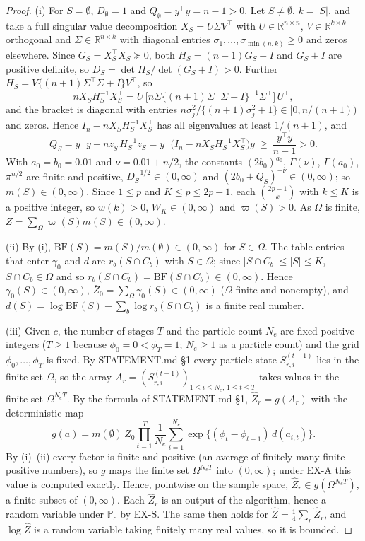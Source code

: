 \documentclass[11pt]{article}
\theoremstyle{remark}
\newcommand{\Zh}{\widehat Z}
\newcommand{\Pc}{\mathbb{P}_c}
\begin{document}
\begin{proof}
(i) For $S=\emptyset$, $D_\emptyset=1$ and $Q_\emptyset=y^\top y=n-1>0$. Let $S\neq\emptyset$, $k=|S|$, and take a full
singular value decomposition $X_S=U\Sigma V^\top$ with $U\in\mathbb{R}^{n\times n}$, $V\in\mathbb{R}^{k\times k}$ orthogonal
and $\Sigma\in\mathbb{R}^{n\times k}$ with diagonal entries $\sigma_1,\dots,\sigma_{\min(n,k)}\ge0$ and zeros elsewhere.
Since $G_S=X_S^\top X_S\succeq0$, both $H_S=(n+1)G_S+I$ and $G_S+I$ are positive definite, so $D_S=\det H_S/\det(G_S+I)>0$.
Further $H_S=V\{(n+1)\Sigma^\top\Sigma+I\}V^\top$, so
\[
nX_SH_S^{-1}X_S^\top=U\,\bigl[n\Sigma\{(n+1)\Sigma^\top\Sigma+I\}^{-1}\Sigma^\top\bigr]\,U^\top,
\]
and the bracket is diagonal with entries $n\sigma_j^2/\{(n+1)\sigma_j^2+1\}\in[0,n/(n+1))$ and zeros. Hence
$I_n-nX_SH_S^{-1}X_S^\top$ has all eigenvalues at least $1/(n+1)$, and
\[
Q_S=y^\top y-nz_S^\top H_S^{-1}z_S=y^\top\bigl(I_n-nX_SH_S^{-1}X_S^\top\bigr)y\ \ge\ \frac{y^\top y}{n+1}>0 .
\]
With $a_0=b_0=0.01$ and $\nu=0.01+n/2$, the constants $(2b_0)^{a_0}$, $\Gamma(\nu)$, $\Gamma(a_0)$, $\pi^{n/2}$ are finite and
positive, $D_S^{-1/2}\in(0,\infty)$ and $(2b_0+Q_S)^{-\nu}\in(0,\infty)$; so $m(S)\in(0,\infty)$. Since $1\le p$ and
$K\le p\le 2p-1$, each $\binom{2p-1}{k}$ with $k\le K$ is a positive integer, so $w(k)>0$, $W_K\in(0,\infty)$ and
$\varpi(S)>0$. As $\Omega$ is finite, $Z=\sum_\Omega\varpi(S)m(S)\in(0,\infty)$.

(ii) By (i), $\mathrm{BF}(S)=m(S)/m(\emptyset)\in(0,\infty)$ for $S\in\Omega$. The table entries that enter $\gamma_0$
and $d$ are $r_b(S\cap C_b)$ with $S\in\Omega$; since $|S\cap C_b|\le|S|\le K$, $S\cap C_b\in\Omega$ and so
$r_b(S\cap C_b)=\mathrm{BF}(S\cap C_b)\in(0,\infty)$. Hence $\gamma_0(S)\in(0,\infty)$, $\bar Z_0=\sum_\Omega\gamma_0(S)\in(0,\infty)$ ($\Omega$ finite and
nonempty), and $d(S)=\log\mathrm{BF}(S)-\sum_b\log r_b(S\cap C_b)$ is a finite real number.

(iii) Given $c$, the number of stages $T$ and the particle count $N_e$ are fixed positive integers ($T\ge1$ because
$\phi_0=0<\phi_T=1$; $N_e\ge1$ as a particle count) and the grid $\phi_0,\dots,\phi_T$ is fixed. By STATEMENT.md \S1 every
particle state $S_{r,i}^{(t-1)}$ lies in the finite set $\Omega$, so the array
$A_r=(S_{r,i}^{(t-1)})_{1\le i\le N_e,\,1\le t\le T}$ takes values in the finite set $\Omega^{N_eT}$. By the formula of
STATEMENT.md \S1, $\Zh_r=g(A_r)$ with the deterministic map
\[
g(a)=m(\emptyset)\,\bar Z_0\prod_{t=1}^T\frac1{N_e}\sum_{i=1}^{N_e}\exp\{(\phi_t-\phi_{t-1})\,d(a_{i,t})\}.
\]
By (i)--(ii) every factor is finite and positive (an average of finitely many finite positive numbers), so $g$ maps the
finite set $\Omega^{N_eT}$ into $(0,\infty)$; under EX-A this value is computed exactly. Hence, pointwise on the sample
space, $\Zh_r\in g(\Omega^{N_eT})$, a finite subset of $(0,\infty)$. Each $\Zh_r$ is an output of the algorithm, hence a
random variable under $\Pc$ by EX-S. The same then holds for $\Zh=\frac14\sum_r\Zh_r$, and $\log\Zh$ is a random
variable taking finitely many real values, so it is bounded.
\end{proof}
\end{document}
